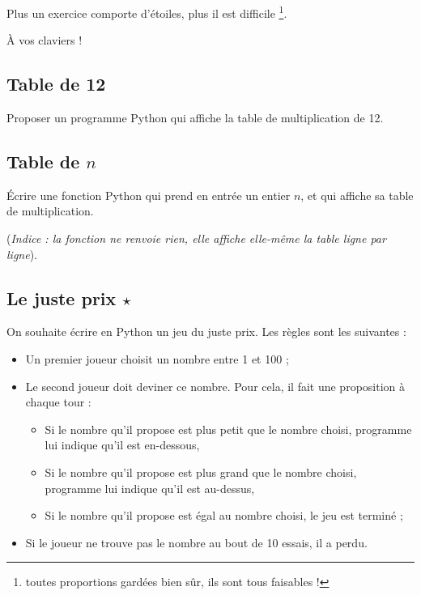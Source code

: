 \documentclass[12pt,a4paper, oneside]{article}
\theoremstyle{definition}
\begin{document}
   Plus un exercice comporte d'étoiles, plus il est difficile \footnote{toutes proportions gardées bien sûr, ils sont tous faisables !}.

   À vos claviers !

   \subsection{Table de 12}\label{subsec:table-de-12}
   Proposer un programme Python qui affiche la table de multiplication de 12.

   \subsection{Table de $n$}\label{subsec:table-de-n}
   Écrire une fonction Python qui prend en entrée un entier $n$, et qui affiche sa table de multiplication.

      (\textit{Indice : la fonction ne renvoie rien, elle affiche elle-même la table ligne par ligne}).

   \subsection{Le juste prix $\star$}\label{subsec:le-juste-prix}
   On souhaite écrire en Python un jeu du juste prix.
   Les règles sont les suivantes :
   \begin{itemize}
      \item Un premier joueur choisit un nombre entre 1 et 100 ;
      \item Le second joueur doit deviner ce nombre.
      Pour cela, il fait une proposition à chaque tour :
      \begin{itemize}
         \item Si le nombre qu'il propose est plus petit que le nombre choisi, programme lui indique qu'il est en-dessous,
         \item Si le nombre qu'il propose est plus grand que le nombre choisi, programme lui indique qu'il est au-dessus,
         \item Si le nombre qu'il propose est égal au nombre choisi, le jeu est terminé ;
      \end{itemize}
      \item Si le joueur ne trouve pas le nombre au bout de 10 essais, il a perdu.
   \end{itemize}
\end{document}

